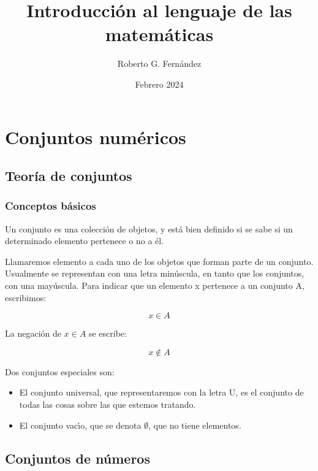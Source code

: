 \documentclass{article}
\title{Introducci\'on al lenguaje de las matem\'aticas}
\author{Roberto G. Fernández}
\date{Febrero 2024}
\begin{document}
\maketitle


\section{Conjuntos num\'ericos}
\subsection{Teor\'ia de conjuntos}

\subsubsection{Conceptos b\'asicos}
Un conjunto es una colecci\'on de objetos, y est\'a bien
definido si se sabe si un determinado elemento pertenece o no
a \'el.

Llamaremos elemento a cada uno de los objetos que forman parte de un conjunto. Usualmente se representan con una letra min\'uscula, en tanto que los conjuntos, con una may\'uscula.
Para indicar que un elemento x pertenece a un conjunto A, escribimos:

\begin{equation}
x \in A
\end{equation}

La negaci\'on de \begin{math}x \in A\end{math} se escribe:

\begin{equation}
x \notin A
\end{equation}

Dos conjuntos especiales son:
\begin{itemize}
  \item El conjunto universal, que representaremos con la letra U, es el conjunto de todas las cosas sobre las que estemos tratando.
  \item El conjunto vac\'ıo, que se denota \begin{math}\emptyset\end{math}, que no tiene elementos.
\end{itemize}


\subsection{Conjuntos de n\'umeros}
\end{document}
